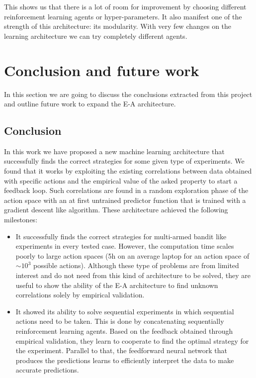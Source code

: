 \documentclass[11pt,a4paper,twoside]{report}
\newcommand{\+}{\textnormal{+} }
\theoremstyle{definition}
\numberwithin{equation}{chapter}
\begin{document}
This shows us that there is a lot of room for improvement by choosing different 
reinforcement learning agents or hyper-parameters. It also manifest one of the 
strength of this architecture: its modularity. With very few changes on the 
learning architecture we can try completely different agents.


\chapter{Conclusion and future work}

In this section we are going to discuss the conclusions extracted from this
project and outline future work to expand the E-A architecture.

\section{Conclusion}

In this work we have proposed a new machine learning architecture that
successfully finds the correct strategies for some given type of experiments. We
found that it works by exploiting the existing correlations between data
obtained with specific actions and the empirical value of the asked property to
start a feedback loop. Such correlations are found in a random exploration phase
of the action space with an at first untrained predictor function that is
trained with a gradient descent like algorithm. These architecture achieved the 
following milestones:
\begin{itemize}
  \item It successfully finds the correct strategies for multi-armed bandit like
  experiments in every tested case. However, the computation time scales poorly
  to large action spaces (5h on an average laptop for an action space of $\sim
  10^3$ possible actions). Although these type of problems are from limited
  interest and do not need from this kind of architecture to be solved, they are
  useful to show the ability of the E-A architecture to find unknown
  correlations solely by empirical validation.
  \item It showed its ability to solve sequential experiments in which
  sequential actions need to be taken. This is done by concatenating
  sequentially reinforcement learning agents. Based on the feedback obtained
  through empirical validation, they learn to cooperate to find the optimal 
  strategy for the experiment. Parallel to that, the feedforward neural network
  that produces the predictions learns to efficiently interpret the data to 
  make accurate predictions.
\end{itemize}
\end{document}
